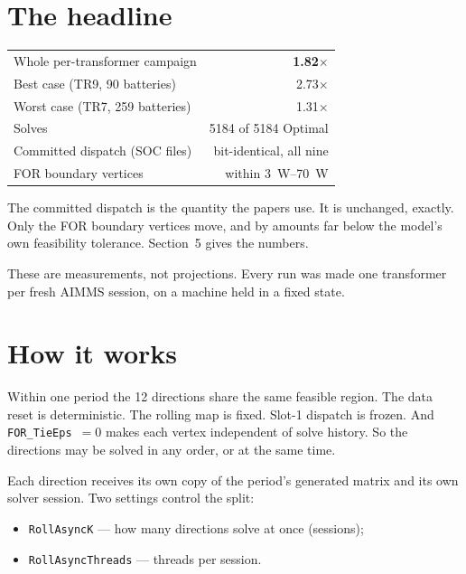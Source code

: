 \documentclass[11pt,a4paper]{article}
\newcommand{\gd}[1]{\textcolor{good}{#1}}
\begin{document}
\vspace{4mm}

\section{The headline}

\begin{center}
\begin{tabular}{@{}l r@{}}
\toprule
Whole per-transformer campaign  & \gd{\textbf{1.82$\times$}} \\
Best case (TR9, 90 batteries)   & 2.73$\times$ \\
Worst case (TR7, 259 batteries) & 1.31$\times$ \\
Solves                          & \gd{5184 of 5184 Optimal} \\
Committed dispatch (SOC files)  & \gd{bit-identical, all nine} \\
FOR boundary vertices           & within \SI{3}{\watt}--\SI{70}{\watt} \\
\bottomrule
\end{tabular}
\end{center}

The committed dispatch is the quantity the papers use. It is unchanged, exactly.
Only the FOR boundary vertices move, and by amounts far below the model's own
feasibility tolerance. Section~5 gives the numbers.

These are measurements, not projections. Every run was made one transformer per
fresh AIMMS session, on a machine held in a fixed state.

\section{How it works}

Within one period the 12 directions share the same feasible region. The data
reset is deterministic. The rolling map is fixed. Slot-1 dispatch is frozen.
And \texttt{FOR\_TieEps}~$=0$ makes each vertex independent of solve history.
So the directions may be solved in any order, or at the same time.

Each direction receives its own copy of the period's generated matrix and its
own solver session. Two settings control the split:

\begin{itemize}
  \item \texttt{RollAsyncK} --- how many directions solve at once (sessions);
  \item \texttt{RollAsyncThreads} --- threads per session.
\end{itemize}
\end{document}
